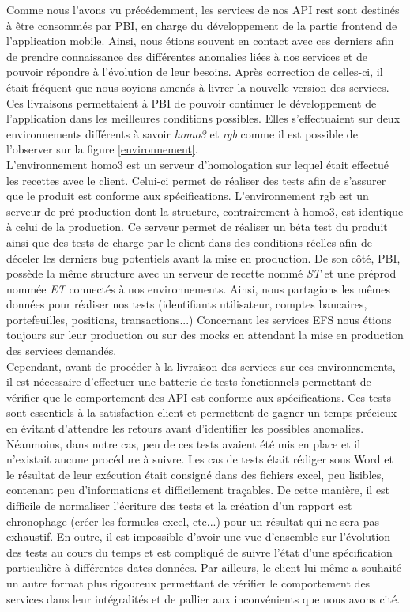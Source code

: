 	Comme nous l'avons vu précédemment, les services de nos API rest sont destinés à être consommés par PBI, en charge du développement de la partie frontend de l'application mobile. Ainsi, nous étions souvent en contact avec ces derniers afin de prendre connaissance des différentes anomalies liées à nos services et de pouvoir répondre à l'évolution de leur besoins. Après correction de celles-ci, il était fréquent que nous soyions amenés à livrer la nouvelle version des services. Ces livraisons permettaient à PBI de pouvoir continuer le développement de l'application dans les meilleures conditions possibles. Elles s'effectuaient sur deux environnements différents à savoir \textit{homo3} et \textit{rgb} comme il est possible de l'observer sur la figure \ref{environnement}. \\
	
	L'environnement homo3 est un serveur d'homologation sur lequel était effectué les recettes avec le client. Celui-ci permet de réaliser des tests afin de s'assurer que le produit est conforme aux spécifications. L'environnement rgb est un serveur de pré-production dont la structure, contrairement à homo3, est identique à celui de la production. Ce serveur permet de réaliser un béta test du produit ainsi que des tests de charge par le client dans des conditions réelles afin de déceler les derniers bug potentiels avant la mise en production. De son côté, PBI, possède la même structure avec un serveur de recette nommé \textit{ST} et une préprod nommée \textit{ET} connectés à nos environnements. Ainsi, nous partagions les mêmes données pour réaliser nos tests (identifiants utilisateur, comptes bancaires, portefeuilles, positions, transactions...) Concernant les services EFS nous étions toujours sur leur production ou sur des mocks en attendant la mise en production des services demandés.\\
	
	Cependant, avant de procéder à la livraison des services sur ces environnements, il est nécessaire d'effectuer une batterie de tests fonctionnels permettant de vérifier que le comportement des API est conforme aux spécifications. Ces tests sont essentiels à la satisfaction client et permettent de gagner un temps précieux en évitant d'attendre les retours avant d'identifier les possibles anomalies. Néanmoins, dans notre cas, peu de ces tests avaient été mis en place et il n'existait aucune procédure à suivre. Les cas de tests était rédiger sous Word et le résultat de leur exécution était consigné dans des fichiers excel, peu lisibles, contenant peu d'informations et difficilement traçables. De cette manière, il est difficile de normaliser l'écriture des tests et la création d'un rapport est chronophage (créer les formules excel, etc...) pour un résultat qui ne sera pas exhaustif. En outre, il est impossible d'avoir une vue d'ensemble sur l'évolution des tests au cours du temps et est compliqué de suivre l'état d'une spécification particulière à différentes dates données. Par ailleurs, le client lui-même a souhaité un autre format plus rigoureux permettant de vérifier le comportement des services dans leur intégralités et de pallier aux inconvénients que nous avons cité. \\	
	
